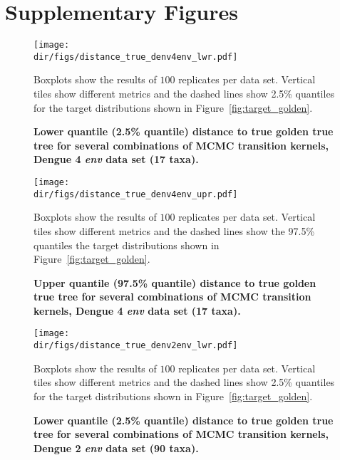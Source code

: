 \chapter{Supplementary Figures}
\begin{figure}[!ht]
\begin{center}
\texttt{[image: \\dir/figs/distance\_true\_denv4env\_lwr.pdf]} 
\end{center}
 \caption[Lower quantile (2.5\% quantile) distance to true golden true tree for several combinations of MCMC transition kernels, Dengue 4 \textit{env} data set (17 taxa).]{\textbf{Lower quantile (2.5\% quantile) distance to true golden true tree for several combinations of MCMC transition kernels, Dengue 4 \textit{env} data set (17 taxa).}
  }
  Boxplots show the results of $100$ replicates per data set.
  Vertical tiles show different metrics and the dashed lines show 2.5\% quantiles for the target distributions shown in Figure~\ref{fig:target_golden}.
 \label{sfig:distance_true_denv4_lwr}
\end{figure}

\begin{figure}[!ht]
\begin{center}
\texttt{[image: \\dir/figs/distance\_true\_denv4env\_upr.pdf]} 
\end{center}
 \caption[Upper quantile (97.5\% quantile) distance to true golden true tree for several combinations of MCMC transition kernels, Dengue 4 \textit{env} data set (17 taxa).]{\textbf{Upper quantile (97.5\% quantile) distance to true golden true tree for several combinations of MCMC transition kernels, Dengue 4 \textit{env} data set (17 taxa).}
  }
  Boxplots show the results of $100$ replicates per data set.
  Vertical tiles show different metrics and the dashed lines show the 97.5\% quantiles the target distributions shown in Figure~\ref{fig:target_golden}.
 \label{sfig:distance_true_denv4_upr}
\end{figure}

\begin{figure}[!ht]
\begin{center}
\texttt{[image: \\dir/figs/distance\_true\_denv2env\_lwr.pdf]} 
\end{center}
 \caption[Lower quantile (2.5\% quantile) distance to true golden true tree for several combinations of MCMC transition kernels, Dengue 2 \textit{env} data set (90 taxa).]{\textbf{Lower quantile (2.5\% quantile) distance to true golden true tree for several combinations of MCMC transition kernels, Dengue 2 \textit{env} data set (90 taxa).}
  }
  Boxplots show the results of $100$ replicates per data set.
  Vertical tiles show different metrics and the dashed lines show 2.5\% quantiles for the target distributions shown in Figure~\ref{fig:target_golden}.
 \label{sfig:distance_true_denv2_lwr}
\end{figure}

